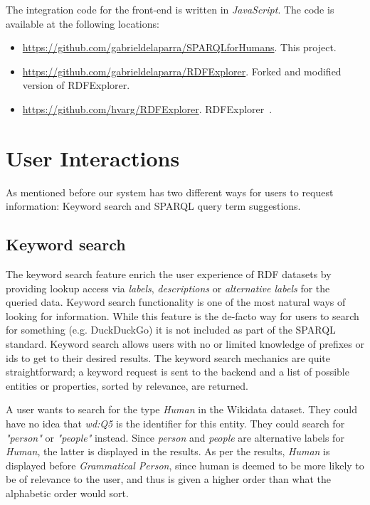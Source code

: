 The integration code for the front-end is written in \textit{JavaScript}. The code is available at the following locations:
\begin{itemize}
    \item \url{https://github.com/gabrieldelaparra/SPARQLforHumans}. This project.
    \item \url{https://github.com/gabrieldelaparra/RDFExplorer}. Forked and modified version of RDFExplorer.
    \item \url{https://github.com/hvarg/RDFExplorer}. RDFExplorer~\cite{Vargas2019}.
\end{itemize}

\section{User Interactions}

As mentioned before our system has two different ways for users to request information: 
Keyword search 
and SPARQL query term suggestions.

\subsection{Keyword search}

The keyword search feature enrich the user experience of RDF datasets by providing lookup access via \textit{labels}, \textit{descriptions} or \textit{alternative labels} for the queried data. 
Keyword search functionality is one of the most natural ways of looking for information. 
While this feature is the de-facto way for users to search for something (e.g. DuckDuckGo) it is not included as part of the SPARQL standard. 
Keyword search allows users with no or limited knowledge of prefixes or ids to get to their desired results. 
The keyword search mechanics are quite straightforward; a keyword request is sent to the backend and a list of possible entities or properties, sorted by relevance, are returned. 

\begin{example}
A user wants to search for the type \textit{Human} in the Wikidata dataset. 
They could have no idea that \textit{wd:Q5} is the identifier for this entity. 
They could search for \textit{"person"} or \textit{"people"} instead. 
Since \textit{person} and \textit{people} are alternative labels for \textit{Human}, the latter is displayed in the results. 
As per the results, \textit{Human} is displayed before \textit{Grammatical Person}, since human is deemed to be more likely to be of relevance to the user, and thus is given a higher order than what the alphabetic order would sort.
\end{example}

